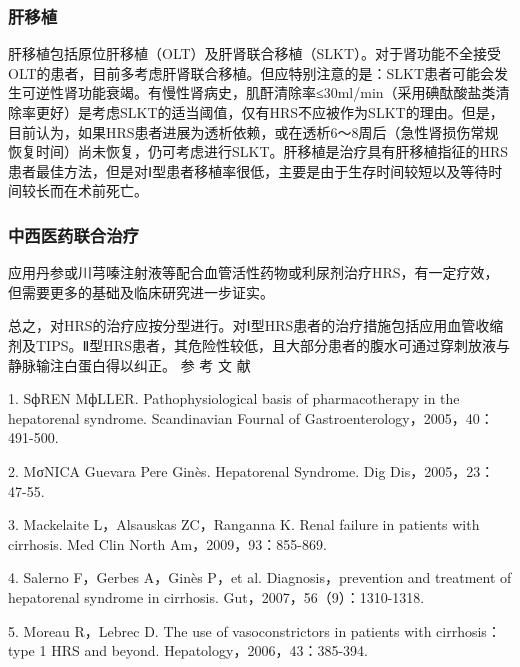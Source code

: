 \subsubsection{肝移植}

肝移植包括原位肝移植（OLT）及肝肾联合移植（SLKT）。对于肾功能不全接受OLT的患者，目前多考虑肝肾联合移植。但应特别注意的是：SLKT患者可能会发生可逆性肾功能衰竭。有慢性肾病史，肌酐清除率≤30ml/min（采用碘酞酸盐类清除率更好）是考虑SLKT的适当阈值，仅有HRS不应被作为SLKT的理由。但是，目前认为，如果HRS患者进展为透析依赖，或在透析6～8周后（急性肾损伤常规恢复时间）尚未恢复，仍可考虑进行SLKT。肝移植是治疗具有肝移植指征的HRS患者最佳方法，但是对Ⅰ型患者移植率很低，主要是由于生存时间较短以及等待时间较长而在术前死亡。

\subsubsection{中西医药联合治疗}

应用丹参或川芎嗪注射液等配合血管活性药物或利尿剂治疗HRS，有一定疗效，但需要更多的基础及临床研究进一步证实。

总之，对HRS的治疗应按分型进行。对Ⅰ型HRS患者的治疗措施包括应用血管收缩剂及TIPS。Ⅱ型HRS患者，其危险性较低，且大部分患者的腹水可通过穿刺放液与静脉输注白蛋白得以纠正。\hypertarget{text00330.htmlux5cux23CHP11-7-3-4}{}
参 考 文 献

1. SфREN MфLLER. Pathophysiological basis of pharmacotherapy in the
hepatorenal syndrome. Scandinavian Fournal of
Gastroenterology，2005，40：491-500.

2. MσNICA Guevara Pere Ginès. Hepatorenal Syndrome. Dig
Dis，2005，23：47-55.

3. Mackelaite L，Alsauskas ZC，Ranganna K. Renal failure in patients
with cirrhosis. Med Clin North Am，2009，93：855-869.

4. Salerno F，Gerbes A，Ginès P，et al. Diagnosis，prevention and
treatment of hepatorenal syndrome in cirrhosis.
Gut，2007，56（9）：1310-1318.

5. Moreau R，Lebrec D. The use of vasoconstrictors in patients with
cirrhosis：type 1 HRS and beyond. Hepatology，2006，43：385-394.

\protect\hypertarget{text00331.html}{}{}

